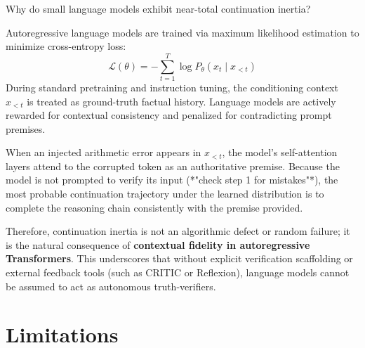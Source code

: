 \documentclass[11pt,letterpaper]{article}
\begin{document}
Why do small language models exhibit near-total continuation inertia?

Autoregressive language models are trained via maximum likelihood estimation to minimize cross-entropy loss:
\begin{equation}
\mathcal{L}(\theta) = -\sum_{t=1}^{T} \log P_\theta(x_t \mid x_{<t})
\end{equation}
During standard pretraining and instruction tuning, the conditioning context $x_{<t}$ is treated as ground-truth factual history. Language models are actively rewarded for contextual consistency and penalized for contradicting prompt premises. 

When an injected arithmetic error appears in $x_{<t}$, the model's self-attention layers attend to the corrupted token as an authoritative premise. Because the model is not prompted to verify its input (*"check step 1 for mistakes"*), the most probable continuation trajectory under the learned distribution is to complete the reasoning chain consistently with the premise provided. 

Therefore, continuation inertia is not an algorithmic defect or random failure; it is the natural consequence of \textbf{contextual fidelity in autoregressive Transformers}. This underscores that without explicit verification scaffolding or external feedback tools (such as CRITIC or Reflexion), language models cannot be assumed to act as autonomous truth-verifiers.

\section{Limitations}
\end{document}
